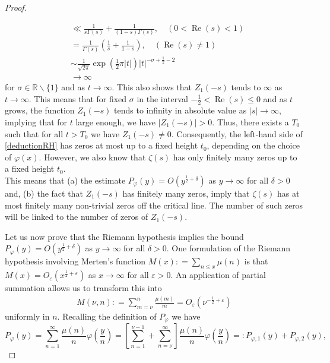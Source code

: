 \documentclass[11pt]{article}
\newcommand{\R}{\mathbb{R}}
\newcommand{\real}{\operatorname{Re}}
\numberwithin{equation}{section}		 			%
\numberwithin{figure}{section}			 			%
\begin{document}
\begin{proof}
\begin{enumerate}
\begin{align}
   &\ll  {\frac{1}{{s\Gamma (s)}}}  +  {\frac{1}{{(1 - s)\Gamma (s)}}} ,\quad (0 < \operatorname{Re} (s) < 1) \nonumber \\
   &=  {\frac{1}{{\Gamma (s)}}\left( {\frac{1}{s} + \frac{1}{{1 - s}}} \right)} ,\quad (\operatorname{Re} (s) \ne 1) \nonumber \\
   &\sim \frac{1}{{\sqrt {2\pi } }}\exp \left( {\frac{1}{2}\pi \left| t \right|} \right){\left| t \right|^{ - \sigma  + \tfrac{1}{2}-2}} \\
   &\to \infty  \nonumber 
\end{align}
for $\sigma \in \R\backslash\{1\}$ and as $t \to \infty$. This also shows that $Z_1(-s)$ tends to $\infty$ as $t \to \infty$. This means that for fixed $\sigma$ in the interval $-\tfrac{1}{2} < \real(s) \le 0$ and as $t$ grows, the function $Z_1(-s)$ tends to infinity in absolute value as $\left| s \right| \to \infty$, implying that for $t$ large enough, we have $\left| {{Z_1}(-s)} \right| > 0$. Thus, there exists a $T_0$ such that for all $t > T_0$ we have ${Z_1}(-s) \ne 0$. Consequently, the left-hand side of \eqref{deductionRH} has zeros at most up to a fixed height $t_0$, depending on the choice of $\varphi(x)$. However, we also know that $\zeta(s)$ has only finitely many zeros up to a fixed height $t_0$.\\
This means that (a) the estimate ${P_\varphi }(y) = O({y^{\tfrac{1}{2} + \delta }})$ as $y \to \infty$ for all $\delta >0$ and, (b) the fact that $Z_1(-s)$ has finitely many zeros, imply that $\zeta(s)$ has at most finitely many non-trivial zeros off the critical line. The number of such zeros will be linked to the number of zeros of $Z_1(-s)$.
\end{enumerate}
\noindent Let us now prove that the Riemann hypothesis implies the bound ${P_\varphi }(y) = O({y^{\tfrac{1}{2} + \delta }})$ as $y \to \infty$ for all $\delta >0$. One formulation of the Riemann hypothesis involving Merten's function $M(x): = \sum\nolimits_{n \leqslant x} {\mu (n)}$ is that $M(x) = {O_\varepsilon }({x^{\tfrac{1}{2} + \varepsilon }})$ as $x \to \infty$ for all $\varepsilon >0$. An application of partial summation allows us to transform this into
\begin{align} \label{RH_mertens_partial}
M(\nu ,n): = \sum\limits_{m = \nu }^n {\frac{{\mu (m)}}{m}}  = {O_\varepsilon }({\nu ^{ - \tfrac{1}{2} + \varepsilon }})
\end{align}
uniformly in $n$. Recalling the definition of $P_\varphi$ we have
\[{P_\varphi }(y) = \sum\limits_{n = 1}^\infty  {\frac{{\mu (n)}}{n}\varphi \left( {\frac{y}{n}} \right)}  = \left[ {\sum\limits_{n = 1}^{\nu  - 1} {}  + \sum\limits_{n = \nu }^\infty  {} } \right]\frac{{\mu (n)}}{n}\varphi \left( {\frac{y}{n}} \right) = :{P_{\varphi ,1}}(y) + {P_{\varphi ,2}}(y),\]

\end{proof}
\end{document}
